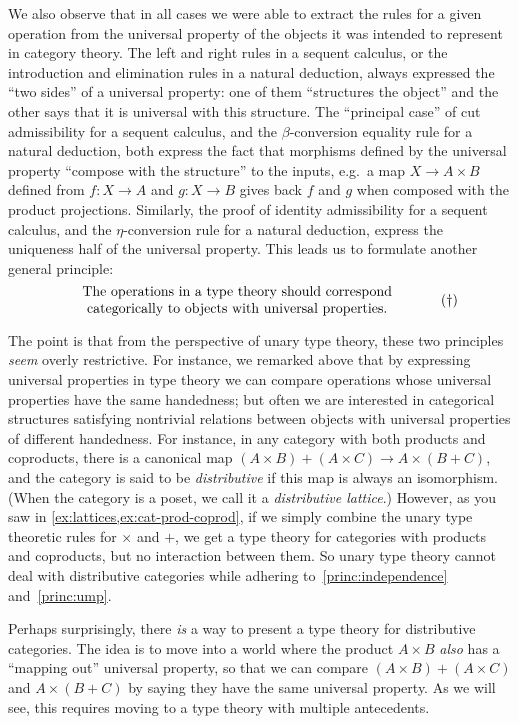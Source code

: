 \documentclass{book}
\begin{document}
We also observe that in all cases we were able to extract the rules for a given operation from the universal property of the objects it was intended to represent in category theory.
The left and right rules in a sequent calculus, or the introduction and elimination rules in a natural deduction, always expressed the ``two sides'' of a universal property: one of them ``structures the object'' and the other says that it is universal with this structure.
The ``principal case'' of cut admissibility for a sequent calculus, and the $\beta$-conversion equality rule for a natural deduction, both express the fact that morphisms defined by the universal property ``compose with the structure'' to the inputs, e.g.\ a map $X\to A\times B$ defined from $f:X\to A$ and $g:X\to B$ gives back $f$ and $g$ when composed with the product projections.
Similarly, the proof of identity admissibility for a sequent calculus, and the $\eta$-conversion rule for a natural deduction, express the uniqueness half of the universal property.
This leads us to formulate another general principle:
\begin{equation}\label{princ:ump}
  \parbox{3.5in}{\centering The operations in a type theory should correspond categorically to objects with universal properties.}\tag{$\dagger$}
\end{equation}

The point is that from the perspective of unary type theory, these two principles \emph{seem} overly restrictive.
For instance, we remarked above that by expressing universal properties in type theory we can compare operations whose universal properties have the same handedness; but often we are interested in categorical structures satisfying nontrivial relations between objects with universal properties of different handedness.
For instance, in any category with both products and coproducts, there is a canonical map $(A\times B)+(A\times C) \to A\times (B+C)$, and the category is said to be \emph{distributive} if this map is always an isomorphism.
(When the category is a poset, we call it a \emph{distributive lattice}.)
However, as you saw in \cref{ex:lattices,ex:cat-prod-coprod}, if we simply combine the unary type theoretic rules for $\times$ and $+$, we get a type theory for categories with products and coproducts, but no interaction between them.
So unary type theory cannot deal with distributive categories while adhering to~\eqref{princ:independence} and~\eqref{princ:ump}.

Perhaps surprisingly, there \emph{is} a way to present a type theory for distributive categories.
The idea is to move into a world where the product $A\times B$ \emph{also} has a ``mapping out'' universal property, so that we can compare $(A\times B)+(A\times C)$ and $A\times (B+C)$ by saying they have the same universal property.
As we will see, this requires moving to a type theory with multiple antecedents.
\end{document}
